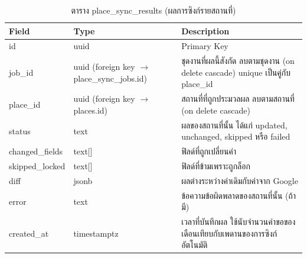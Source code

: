 \begin{table}[H]
\centering
\caption{ตาราง place\_sync\_results (ผลการซิงก์รายสถานที่)}
\label{tab:db_syncresults}
\begin{tabular}{|p{3.6cm}|p{2.6cm}|p{6.8cm}|}
\hline
\textbf{Field} & \textbf{Type} & \textbf{Description} \\
\hline
id & uuid & Primary Key \\ \hline
job\_id & uuid (foreign key $\to$ place\_sync\_jobs.id) & ชุดงานที่ผลนี้สังกัด ลบตามชุดงาน (on delete cascade) unique เป็นคู่กับ place\_id \\ \hline
place\_id & uuid (foreign key $\to$ places.id) & สถานที่ที่ถูกประมวลผล ลบตามสถานที่ (on delete cascade) \\ \hline
status & text & ผลของสถานที่นั้น ได้แก่ updated, unchanged, skipped หรือ failed \\ \hline
changed\_fields & text[] & ฟิลด์ที่ถูกเปลี่ยนค่า \\ \hline
skipped\_locked & text[] & ฟิลด์ที่ข้ามเพราะถูกล็อก \\ \hline
diff & jsonb & ผลต่างระหว่างค่าเดิมกับค่าจาก Google \\ \hline
error & text & ข้อความข้อผิดพลาดของสถานที่นั้น (ถ้ามี) \\ \hline
created\_at & timestamptz & เวลาที่บันทึกผล ใช้นับจำนวนคำขอของเดือนเทียบกับเพดานของการซิงก์อัตโนมัติ \\
\hline
\end{tabular}
\end{table}

